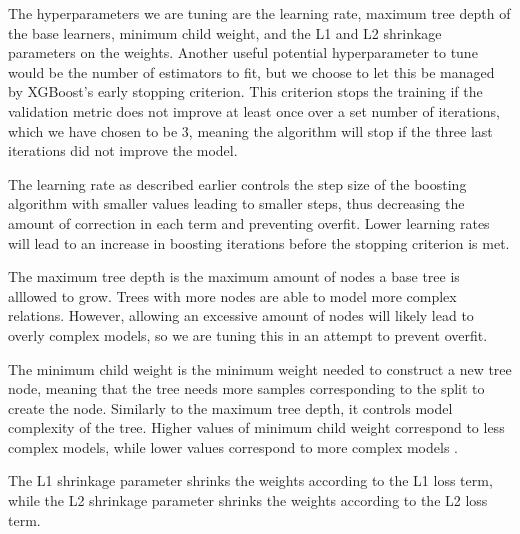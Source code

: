 \documentclass[a4paper, 11pt, twocolumn]{article}
\begin{document}
The hyperparameters we are tuning are the learning rate, maximum tree depth of 
the base learners, minimum child weight, and the L1 and L2 shrinkage parameters 
on the weights. Another useful potential hyperparameter to tune would be the 
number of estimators to fit, but we choose to let this be managed by XGBoost's 
early stopping criterion. This criterion stops the training if the validation 
metric does not improve at least once over a set number of iterations, which we 
have chosen to be 3, meaning the algorithm will stop if the three last iterations did 
not improve the model. 

The learning rate as described earlier controls the step size of the boosting 
algorithm with smaller values leading to smaller steps, thus decreasing the 
amount of correction in each term and preventing overfit. Lower learning rates 
will lead to an increase in boosting iterations before the stopping criterion is 
met. 

The maximum tree depth is the maximum amount of nodes a base tree is alllowed to 
grow. Trees with more nodes are able to model more complex relations. However, 
allowing an excessive amount of nodes will likely lead to overly complex models, 
so we are tuning this in an attempt to prevent overfit. 

The minimum child weight is the minimum weight needed to construct a new tree 
node, meaning that the tree needs more samples corresponding to the split to 
create the node. Similarly to the maximum tree depth, it controls model 
complexity of the tree. Higher values of minimum child weight correspond to less 
complex models, while lower values correspond to more complex models 
\cite{xgboost_tuning}.

The L1 shrinkage parameter shrinks the weights according to the L1 loss term, 
while the L2 shrinkage parameter shrinks the weights according to the L2 loss 
term. 
\end{document}

